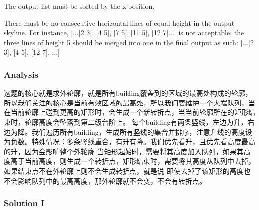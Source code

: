 The output list must be sorted by the x position.

There must be no consecutive horizontal lines of equal height in the output skyline. For instance, [...[2 3], [4 5], [7 5], [11 5], [12 7]...] is not acceptable; the three lines of height 5 should be merged into one in the final output as such: [...[2 3], [4 5], [12 7], ...]

\subsubsection{Analysis}

这题的核心就是求外轮廓，就是所有building覆盖到的区域的最高处构成的轮廓，所以我们关注的核心是当前有效区域的最高处，所以我们要维护一个大端队列，当在当前轮廓上碰到更高的矩形时，会生成一个新转折点，当当前轮廓所在的矩形结束时，轮廓高度会坠落到第二级台阶上。
每个building有两条竖线，左边为升，右边为降。我们遍历所有building，生成所有竖线的集合并排序，注意升线的高度设为负数。特殊情况：多条竖线重合，有升有降。我们优先看升，且优先看高度最高的升，因为会影响整个外轮廓
当矩形起始时，需要将其高度加入队列，如果其高度高于当前高度，则生成一个转折点，矩形结束时，需要将其高度从队列中去掉，如果结束点不在外轮廓上则不会生成转折点，就是说
即使去掉了该矩形的高度也不会影响队列中的最高高度，那外轮廓就不会变，不会有转折点。

\newpage

\subsubsection{Solution I}

